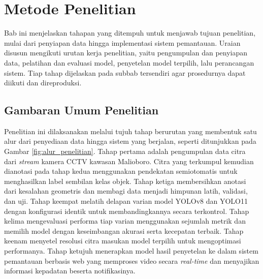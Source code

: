 \chapter{Metode Penelitian}

Bab ini menjelaskan tahapan yang ditempuh untuk menjawab tujuan penelitian, mulai dari 
penyiapan data hingga implementasi sistem pemantauan. Uraian disusun mengikuti urutan kerja 
penelitian, yaitu pengumpulan dan penyiapan data, pelatihan dan evaluasi model, penyetelan 
model terpilih, lalu perancangan sistem. Tiap tahap dijelaskan pada subbab tersendiri agar 
prosedurnya dapat diikuti dan direproduksi.

\section{Gambaran Umum Penelitian}
\label{sec:gambaran_umum}

Penelitian ini dilaksanakan melalui tujuh tahap berurutan yang membentuk satu
alur dari penyediaan data hingga sistem yang berjalan, seperti ditunjukkan pada Gambar
\ref{fig:alur_penelitian}. Tahap pertama adalah pengumpulan data citra dari \textit{stream} kamera CCTV
kawasan Malioboro. Citra yang terkumpul kemudian dianotasi pada tahap kedua
menggunakan pendekatan semiotomatis untuk menghasilkan label sembilan kelas objek.
Tahap ketiga membersihkan anotasi dari kesalahan geometris dan membagi data menjadi
himpunan latih, validasi, dan uji. Tahap keempat melatih delapan varian model YOLOv8
dan YOLO11 dengan konfigurasi identik untuk membandingkannya secara terkontrol. Tahap
kelima mengevaluasi performa tiap varian menggunakan sejumlah metrik dan memilih
model dengan keseimbangan akurasi serta kecepatan terbaik. Tahap keenam menyetel
resolusi citra masukan model terpilih untuk mengoptimasi performanya. Tahap ketujuh
menerapkan model hasil penyetelan ke dalam sistem pemantauan berbasis web yang
memproses video secara \textit{real-time} dan menyajikan informasi kepadatan beserta
notifikasinya.

